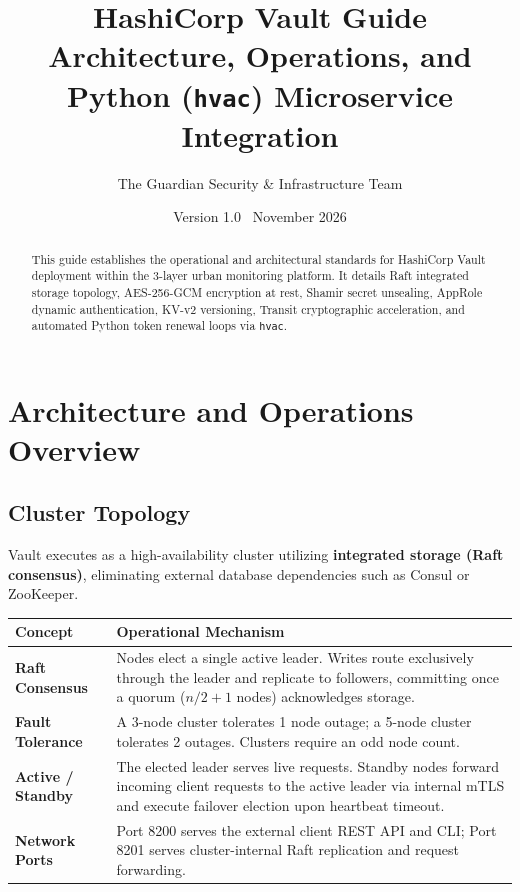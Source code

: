 \documentclass[11pt,a4paper]{article}
\title{\sffamily\bfseries\huge HashiCorp Vault Guide\\[0.3em]
\Large Architecture, Operations, and Python (\texttt{hvac}) Microservice Integration}
\author{\textsf{The Guardian Security \& Infrastructure Team}}
\date{\textsf{Version 1.0 \textbar\ November 2026}}
\begin{document}
\maketitle
\thispagestyle{fancy}

\begin{abstract}
\noindent This guide establishes the operational and architectural standards for HashiCorp Vault deployment within the 3-layer urban monitoring platform. It details Raft integrated storage topology, AES-256-GCM encryption at rest, Shamir secret unsealing, AppRole dynamic authentication, KV-v2 versioning, Transit cryptographic acceleration, and automated Python token renewal loops via \texttt{hvac}.
\end{abstract}

\vspace{0.3cm}

\section{Architecture and Operations Overview}

\subsection{Cluster Topology}
Vault executes as a high-availability cluster utilizing \textbf{integrated storage (Raft consensus)}, eliminating external database dependencies such as Consul or ZooKeeper.

\begin{table}[htbp]
\centering
\small
\begin{tabularx}{\textwidth}{p{3.2cm}X}
\toprule
\textbf{Concept} & \textbf{Operational Mechanism} \\
\midrule
\textbf{Raft Consensus} & Nodes elect a single active leader. Writes route exclusively through the leader and replicate to followers, committing once a quorum ($n/2 + 1$ nodes) acknowledges storage. \\
\textbf{Fault Tolerance} & A 3-node cluster tolerates 1 node outage; a 5-node cluster tolerates 2 outages. Clusters require an odd node count. \\
\textbf{Active / Standby} & The elected leader serves live requests. Standby nodes forward incoming client requests to the active leader via internal mTLS and execute failover election upon heartbeat timeout. \\
\textbf{Network Ports} & Port 8200 serves the external client REST API and CLI; Port 8201 serves cluster-internal Raft replication and request forwarding. \\
\bottomrule
\end{tabularx}
\end{table}
\end{document}
